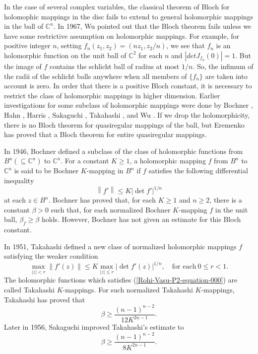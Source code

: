 \documentclass[a4paper,12pt,reqno]{amsart}
\theoremstyle{plain}
\theoremstyle{definition}
\numberwithin{equation}{section}
\begin{document}
In the case of several complex variables, the classical theorem of Bloch for holomophic mappings in the disc fails to extend to general holomorphic mappings in the ball of $\mathbb{C}^n$. In 1967, Wu \cite{Wu-1967}  pointed out that the Bloch theorem fails unless we have some restrictive assumption on holomorphic mappings. For example, for positive integer $n$, setting $ f_n(z_1, z_2) = (nz_1,z_2/n)$, we see that $f_n$ is an holomorphic function on the unit ball of $\mathbb{C}^2$ for each $n$ and $|detJ_{f_n}(0)|= 1$. But the image of $f$ contains the schlicht ball of radius at most $1/n$. So, the infimum of the radii of the schlicht balls
anywhere when all members of $\{f_n\}$ are taken into account is zero. In order that there is a positive Bloch constant, it is necessary to restrict the class of holomorphic mappings in higher dimension. Earlier investigations for some subclass of holomorphic mappings were done by Bochner \cite{Bochner-1946}, Hahn \cite{Hahn-1973}, Harris \cite{Harris-1977}, Sakaguchi \cite{Sakaguchi-1956}, Takahashi \cite{Takahashi-1951}, and Wu \cite{Wu-1967}. If we drop the holomorphicity, there is no Bloch theorem for quasiregular mappings of the ball, but Eremenko \cite{Eremenko-2000} has proved that a Bloch theorem for entire quasiregular mappings.
\vspace{2mm}

In 1946, Bochner \cite{Bochner-1946} defined a subclass of the class of holomorphic functions from $B^n\left(\subseteq \mathbb{C}^n\right)$ to $\mathbb{C}^n$. For a constant $K \geq 1$, a holomorphic mapping $f$ from $B^n$ to $\mathbb{C}^n$ is said to be Bochner $K$-mapping in $B^n$ if $f$ satisfies the following differential inequality
$$
\left\|f'\right\| \leq K\left|\operatorname{det} f'\right|^{1/n}
$$
at each $z \in B^n$. Bochner \cite{Bochner-1946} has proved  that, for each $K \geq 1$ and $n \geq 2$, there is a constant $\beta>0$ such that, for each normalized Bochner $K$-mapping $f$ in the unit ball, $\beta_f \geq \beta$ holds. However, Bochner has not given an estimate for this Bloch constant.
\vspace{2mm}

In 1951, Takahashi \cite{Takahashi-1951} defined a new class of normalized holomorphic mappings $f$ satisfying the weaker condition
\begin{equation}\label{Rohi-Vasu-P2-equation-000}
\max_{|z|<r}\|f'(z)\|\leq K\max_{|z|\leq r}|\operatorname{det} f'(z)|^{1/n}, \quad \text{for each}\ 0\leq r<1.
\end{equation}
The holomorphic functions which satisfies (\ref{Rohi-Vasu-P2-equation-000}) are called Takahashi $K$-mappings. For such normalized Takahashi $K$-mappings, Takahashi \cite{Takahashi-1951} has proved that
$$\beta\geq \frac{(n-1)^{n-2}}{12K^{2n-1}}.$$
\vspace{2mm}
Later in 1956, Sakaguchi \cite{Sakaguchi-1956} improved Takahashi's estimate to
$$\beta \geq \frac{(n-1)^{n-2}}{8K^{2n-1}}.$$ 
\vspace{2mm}
\end{document}
